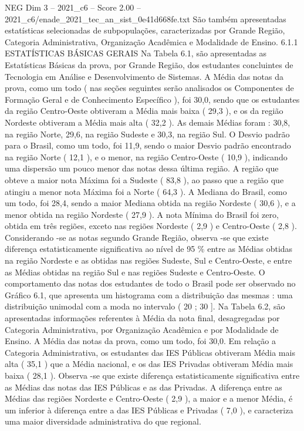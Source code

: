 \begin{textsample}{NEG Dim 3 – 2021\_c6 – Score 2.00 – 2021\_c6/enade\_2021\_tec\_an\_sist\_0e41d668fe.txt}
São também apresentadas estatísticas selecionadas de subpopulações, caracterizadas por Grande Região, Categoria Administrativa, Organização Acadêmica e Modalidade de Ensino. 6.1.1 ESTATÍSTICAS BÁSICAS GERAIS Na Tabela 6.1, são apresentadas as Estatísticas Básicas da prova, por Grande Região, dos estudantes concluintes de Tecnologia em Análise e Desenvolvimento de Sistemas.
A Média das notas da prova, como um todo ( nas seções seguintes serão analisados os Componentes de Formação Geral e de Conhecimento Específico ), foi 30,0, sendo que os estudantes da região Centro-Oeste obtiveram a Média mais baixa ( 29,3 ), e os da região Nordeste obtiveram a Média mais alta ( 32,2 ).
As demais Médias foram : 30,8, na região Norte, 29,6, na região Sudeste e 30,3, na região Sul.
O Desvio padrão para o Brasil, como um todo, foi 11,9, sendo o maior Desvio padrão encontrado na região Norte ( 12,1 ), e o menor, na região Centro-Oeste ( 10,9 ), indicando uma dispersão um pouco menor das notas dessa última região.
A região que obteve a maior nota Máxima foi a Sudeste ( 83,8 ), ao passo que a região que atingiu a menor nota Máxima foi a Norte ( 64,3 ).
A Mediana do Brasil, como um todo, foi 28,4, sendo a maior Mediana obtida na região Nordeste ( 30,6 ), e a menor obtida na região Nordeste ( 27,9 ).
A nota Mínima do Brasil foi zero, obtida em três regiões, exceto nas regiões Nordeste ( 2,9 ) e Centro-Oeste ( 2,8 ).
Considerando -se as notas segundo Grande Região, observa -se que existe diferença estatisticamente significativa ao nível de 95 \% entre as Médias obtidas na região Nordeste e as obtidas nas regiões Sudeste, Sul e Centro-Oeste, e entre as Médias obtidas na região Sul e nas regiões Sudeste e Centro-Oeste.
O comportamento das notas dos estudantes de todo o Brasil pode ser observado no Gráfico 6.1, que apresenta um histograma com a distribuição das mesmas : uma distribuição unimodal com a moda no intervalo ( 20 ; 30 ].
Na Tabela 6.2, são apresentadas informações referentes à Média da nota final, desagregadas por Categoria Administrativa, por Organização Acadêmica e por Modalidade de Ensino.
A Média das notas da prova, como um todo, foi 30,0.
Em relação a Categoria Administrativa, os estudantes das IES Públicas obtiveram Média mais alta ( 35,1 ) que a Média nacional, e os das IES Privadas obtiveram Média mais baixa ( 28,1 ).
Observa -se que existe diferença estatisticamente significativa entre as Médias das notas das IES Públicas e as das Privadas.
A diferença entre as Médias das regiões Nordeste e Centro-Oeste ( 2,9 ), a maior e a menor Média, é um inferior à diferença entre a das IES Públicas e Privadas ( 7,0 ), e caracteriza uma maior diversidade administrativa do que regional.

\end{textsample}
